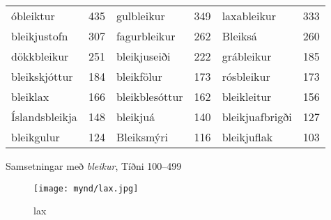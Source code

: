 \documentclass[../samsetningasafn.tex]{subfiles}
\begin{document}
\begin{wordlist}[H]
\begin{tcolorbox}

	\setlength{\extrarowheight}{3pt}
	\begin{tabular}{BlBlBl}		
		óbleiktur		& 435		& 	
		gulbleikur	& 349		& 	
		laxableikur	& 333		\\ 	
		bleikjustofn	& 307		& 	
		fagurbleikur	& 262		& 
		Bleiksá		& 260		\\  
		dökkbleikur	& 251		& 	
		bleikjuseiði	& 222		& 	
		grábleikur	& 185		\\ 	
		bleikskjóttur	& 184		& 
		bleikfölur	& 173		& 	
		rósbleikur	& 173		\\ 	
		bleiklax		& 166		& 	
		bleikblesóttur	& 162		& 	
		bleikleitur	& 156		\\ 	
		Íslandsbleikja	& 	148	& 	
		bleikjuá		&	140		& 	
		bleikjuafbrigði &		127	\\ 	
		bleikgulur	&	124		& 	
		Bleiksmýri	&	116		& 	
		bleikjuflak	&	103				
	\end{tabular}

\end{tcolorbox}
	\caption{Samsetningar með \textit{bleikur}, Tíðni 100--499}
	\label{listi:bleikt.100}
\end{wordlist}

\begin{figure}[H]
\begin{tcolorbox}
\centering
	\texttt{[image: mynd/lax.jpg]}
\end{tcolorbox}
	\caption{lax}
	\label{mynd:lax}
\end{figure}	
\end{document}
